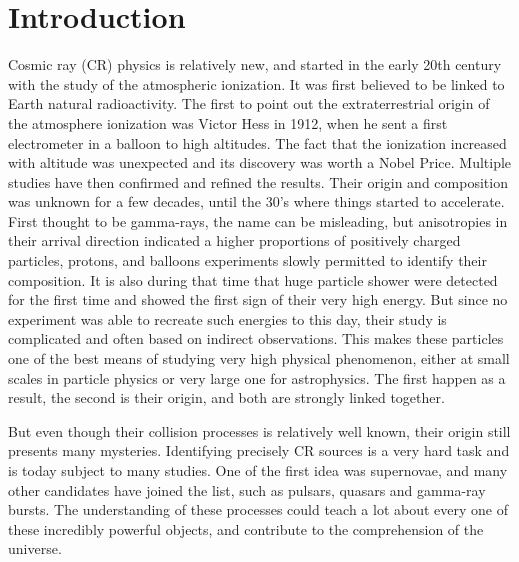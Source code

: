 \chapter*{Introduction}
\label{ch:introduction}

%
%
%
%	

Cosmic ray (CR) physics is relatively new, and started in the early 20th century with the study of the atmospheric ionization. It was first believed to be linked to Earth natural radioactivity. The first to point out the extraterrestrial origin of the atmosphere ionization was Victor Hess in 1912, when he sent a first electrometer in a balloon to high altitudes. The fact that the ionization increased with altitude was unexpected and its discovery was worth a Nobel Price. Multiple studies have then confirmed and refined the results. Their origin and composition was unknown for a few decades, until the 30's where things started to accelerate. First thought to be gamma-rays, the name can be misleading, but anisotropies in their arrival direction indicated a higher proportions of positively charged particles, protons, and balloons experiments slowly permitted to identify their composition. It is also during that time that huge particle shower were detected for the first time and showed the first sign of their very high energy. But since no experiment was able to recreate such energies to this day, their study is complicated and often based on indirect observations. This makes these particles one of the best means of studying very high physical phenomenon, either at small scales in particle physics or very large one for astrophysics. The first happen as a result, the second is their origin, and both are strongly linked together. 

But even though their collision processes is relatively well known, their origin still presents many mysteries. Identifying precisely CR sources is a very hard task and is today subject to many studies. One of the first idea was supernovae, and many other candidates have joined the list, such as pulsars, quasars and gamma-ray bursts. The understanding of these processes could teach a lot about every one of these incredibly powerful objects, and contribute to the comprehension of the universe.

